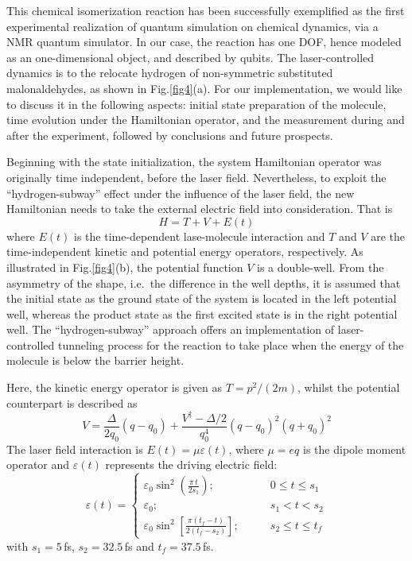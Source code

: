 \documentclass[8.5pt,twoside,twocolumn]{article}
\newcommand{\be}{\begin{equation}}
\newcommand{\ee}{\end{equation}}
\begin{document}
This chemical isomerization reaction has been successfully exemplified
as the first experimental realization of
quantum simulation on chemical dynamics,
via a NMR quantum simulator.\cite{NMR_dynamic}
In our case, the reaction has one DOF, hence modeled
as an one-dimensional object, and described by qubits.
The laser-controlled dynamics is to the relocate hydrogen
of non-symmetric substituted malonaldehydes,\cite{Hydrogen-Subway}
as shown in Fig.\ref{fig4}(a).
For our implementation, we would like to discuss it in the following aspects:
initial state preparation of the molecule,
time evolution under the Hamiltonian operator,
and the measurement during and after the experiment,
followed by conclusions and future prospects.

Beginning with the state initialization,
the system Hamiltonian operator was originally time independent,
before the laser field. Nevertheless, to exploit
the ``hydrogen-subway'' effect under the influence of the laser field,
the new Hamiltonian needs to take the external electric field
into consideration. That is
\[H = T + V + E(t)\]
where $E(t)$ is the time-dependent lase-molecule interaction
and $T$ and $V$ are the time-independent kinetic and potential energy operators, respectively.
As illustrated in Fig.\ref{fig4}(b), the potential function $V$
is a double-well.
From the asymmetry of the shape, i.e.\
the difference in the well depths, it is assumed that
the initial state as the ground state of the system
is located in the left potential well,
whereas the product state as the first excited state
is in the right potential well.
The ``hydrogen-subway'' approach offers
an implementation of laser-controlled tunneling process
for the reaction to take place when the energy of the molecule is
below the barrier height.

Here, the kinetic energy operator is given as $T = p^{2} /(2m)$,
whilst the potential counterpart is described as
\be\label{potential}
 {V}=\frac{\Delta}{2q_0}(  q-q_0)+\frac{V^\ddag-\Delta/2}{q_0^4}(  q-q_0)^2(  q+q_0)^2
\ee
The laser field interaction is $E(t) = \mu\varepsilon(t)$,
where $\mu = eq$ is the dipole moment operator and $\varepsilon(t)$
represents the driving electric field:
\be
  \varepsilon(t)=\left\{
    \begin{array}{cc}
       \varepsilon_0\sin^2(\frac{\pi\, t}     {2s_1})         ;&\qquad   0\leq t\leq s_1\\
       \varepsilon_0                                        ;&\qquad   s_1<t<s_2\\
       \varepsilon_0\sin^2[\frac{\pi(t_{\!f}-t)}{2(t_{\!f}-s_2)}]   ;&\qquad   s_2\leq t\leq t_f
    \end{array}
  \right.
\ee
with $s_1=5\,$fs, $s_2=32.5\,$fs and $t_f=37.5\,$fs.
\end{document}
